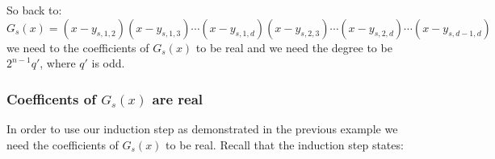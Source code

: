 \documentclass[12pt]{article}
\begin{document}
%
%
%




So back to:
$$ G_s(x) =(x-y_{s,1,2})(x-y_{s,1,3})\cdots(x-y_{s,1,d})(x-y_{s,2,3})\cdots (x-y_{s,2,d})\cdots (x-y_{s,d-1,d})$$
we need to the coefficients of $G_s(x)$ to be real and we need the degree to be $2^{n-1}q'$, where $q'$ is odd.

\subsubsection*{Coefficents of $G_s(x)$ are real}

%
%
%

In order to use our induction step as demonstrated in the previous example we need the coefficients of $G_s(x)$ to be real.  Recall that the induction step states: 
\begin{center}

\end{center}
\end{document}

